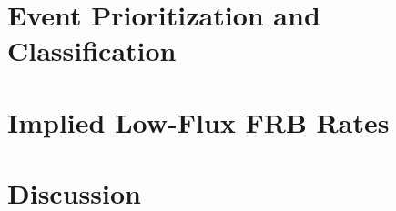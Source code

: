 \documentclass[a4paper,fleqn,usenatbib]{mnras}
\begin{document}


\section{Event Prioritization and Classification}
\label{sec:event_classify}


\section{Implied Low-Flux FRB Rates}
\label{sec:frb_rates}



\section{Discussion}
\label{sec:discuss}

\end{document}
